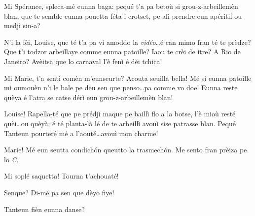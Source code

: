 \begin{drama}

\Louisespeaks Mi Spérance, spleca-mé eunna baga: pequé t'a pa betoù si grou-z-arbeillemèn blan, que te semble eunna pou\-et\-ta féta i crotset, pe alì prendre eun apéritif ou medjì sin-a?

\Sperancespeaks  N'i la fèi, Louise, que té t'a pa vi amoddo la \textit{vidéo}\ldots é can mimo fran té te prèdze? Que t'i todzor arbeillaye comme eunna patoille? Iaou te crèi de itre? A Rio de Janeiro? Avèitsa que lo carnaval l'è fenì é dèi tchica!

\Louisespeaks Mi Marie, t’a sentì comèn m’eunseurte? Acouta seuilla bella! Mé si eunna patoille mi oumouèn n'i le bale pe deu sen que penso\ldots pa comme vo doe! Eunna reste quèya é l'atra se catse dérì eun grou-z-arbeillemèn blan!

\Alicespeaks  Louise! Rapella-té que pe prédjì maque pe baillì flo a la botse, l’è mioù resté quèi\ldots ou quèyà;  é té planta-là lé de te arbeillì avouì sise patrasse blan. Pequé Tanteun pourteré mé a l’aouté\ldots avouì mon charme!


\Sperancespeaks Marie! Mé eun seutta condich\'on queutto la trasmech\'on. Me sento fran prèiza pe lo \textit{C}.


\Alicespeaks Mi soplé saquetta! Tourna t'achouaté!

\Sperancespeaks Senque? Di-mé pa sen que dèyo fiye!


\Louisespeaks{} Tanteun fièn eunna danse?





\end{drama}
